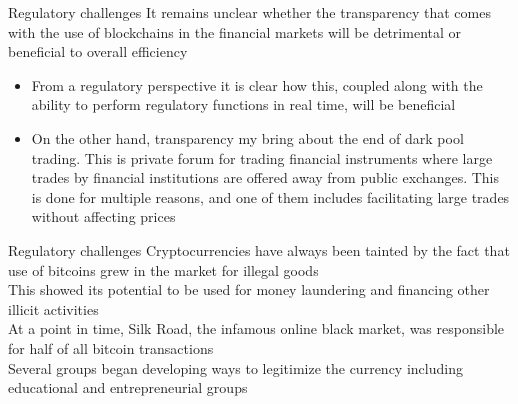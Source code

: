 \documentclass[9pt]{beamer}
\begin{document}


\begin{frame}{Regulatory challenges}
	It remains unclear whether the transparency that comes with the use of blockchains in the financial markets will be detrimental or beneficial to overall efficiency
	\begin{itemize}
		\item From a regulatory perspective it is clear how this, coupled along with the ability to perform regulatory functions in real time, will be beneficial
		\item On the other hand, transparency my bring about the end of dark pool trading. This is private forum for trading financial instruments where large trades by financial institutions are offered away from public exchanges. This is done for multiple reasons, and one of them includes facilitating large trades without affecting prices
	\end{itemize}
\end{frame}


\begin{frame}{Regulatory challenges}
	Cryptocurrencies have always been tainted by the fact that use of bitcoins grew in the market for illegal goods\\ \vspace{3mm}
	This showed its potential to be used for money laundering and financing other illicit activities \\ \vspace{3mm} %
	At a point in time, Silk Road, the infamous online black market, was responsible for half of all bitcoin transactions\\ \vspace{3mm}
	Several groups began developing ways to legitimize the currency including educational and entrepreneurial groups
\end{frame}

\end{document}
